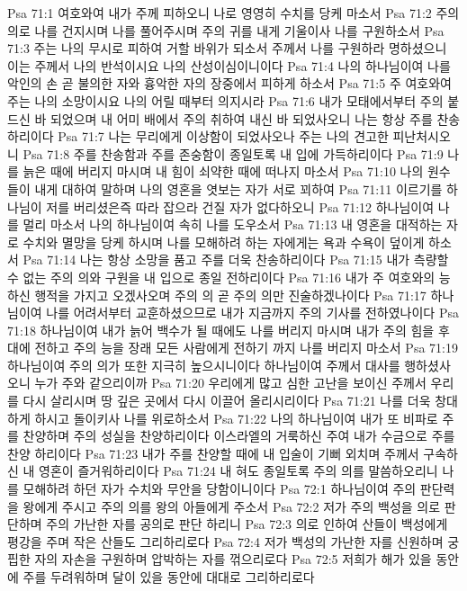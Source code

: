 Psa 71:1  여호와여 내가 주께 피하오니 나로 영영히 수치를 당케 마소서
Psa 71:2  주의 의로 나를 건지시며 나를 풀어주시며 주의 귀를 내게 기울이사 나를 구원하소서
Psa 71:3  주는 나의 무시로 피하여 거할 바위가 되소서 주께서 나를 구원하라 명하셨으니 이는 주께서 나의 반석이시요 나의 산성이심이니이다
Psa 71:4  나의 하나님이여 나를 악인의 손 곧 불의한 자와 흉악한 자의 장중에서 피하게 하소서
Psa 71:5  주 여호와여 주는 나의 소망이시요 나의 어릴 때부터 의지시라
Psa 71:6  내가 모태에서부터 주의 붙드신 바 되었으며 내 어미 배에서 주의 취하여 내신 바 되었사오니 나는 항상 주를 찬송하리이다
Psa 71:7  나는 무리에게 이상함이 되었사오나 주는 나의 견고한 피난처시오니
Psa 71:8  주를 찬송함과 주를 존숭함이 종일토록 내 입에 가득하리이다
Psa 71:9  나를 늙은 때에 버리지 마시며 내 힘이 쇠약한 때에 떠나지 마소서
Psa 71:10  나의 원수들이 내게 대하여 말하며 나의 영혼을 엿보는 자가 서로 꾀하여
Psa 71:11  이르기를 하나님이 저를 버리셨은즉 따라 잡으라 건질 자가 없다하오니
Psa 71:12  하나님이여 나를 멀리 마소서 나의 하나님이여 속히 나를 도우소서
Psa 71:13  내 영혼을 대적하는 자로 수치와 멸망을 당케 하시며 나를 모해하려 하는 자에게는 욕과 수욕이 덮이게 하소서
Psa 71:14  나는 항상 소망을 품고 주를 더욱 찬송하리이다
Psa 71:15  내가 측량할 수 없는 주의 의와 구원을 내 입으로 종일 전하리이다
Psa 71:16  내가 주 여호와의 능하신 행적을 가지고 오겠사오며 주의 의 곧 주의 의만 진술하겠나이다
Psa 71:17  하나님이여 나를 어려서부터 교훈하셨으므로 내가 지금까지 주의 기사를 전하였나이다
Psa 71:18  하나님이여 내가 늙어 백수가 될 때에도 나를 버리지 마시며 내가 주의 힘을 후대에 전하고 주의 능을 장래 모든 사람에게 전하기 까지 나를 버리지 마소서
Psa 71:19  하나님이여 주의 의가 또한 지극히 높으시니이다 하나님이여 주께서 대사를 행하셨사오니 누가 주와 같으리이까
Psa 71:20  우리에게 많고 심한 고난을 보이신 주께서 우리를 다시 살리시며 땅 깊은 곳에서 다시 이끌어 올리시리이다
Psa 71:21  나를 더욱 창대하게 하시고 돌이키사 나를 위로하소서
Psa 71:22  나의 하나님이여 내가 또 비파로 주를 찬양하며 주의 성실을 찬양하리이다 이스라엘의 거룩하신 주여 내가 수금으로 주를 찬양 하리이다
Psa 71:23  내가 주를 찬양할 때에 내 입술이 기뻐 외치며 주께서 구속하신 내 영혼이 즐거워하리이다
Psa 71:24  내 혀도 종일토록 주의 의를 말씀하오리니 나를 모해하려 하던 자가 수치와 무안을 당함이니이다
Psa 72:1  하나님이여 주의 판단력을 왕에게 주시고 주의 의를 왕의 아들에게 주소서
Psa 72:2  저가 주의 백성을 의로 판단하며 주의 가난한 자를 공의로 판단 하리니
Psa 72:3  의로 인하여 산들이 백성에게 평강을 주며 작은 산들도 그리하리로다
Psa 72:4  저가 백성의 가난한 자를 신원하며 궁핍한 자의 자손을 구원하며 압박하는 자를 꺾으리로다
Psa 72:5  저희가 해가 있을 동안에 주를 두려워하며 달이 있을 동안에 대대로 그리하리로다
